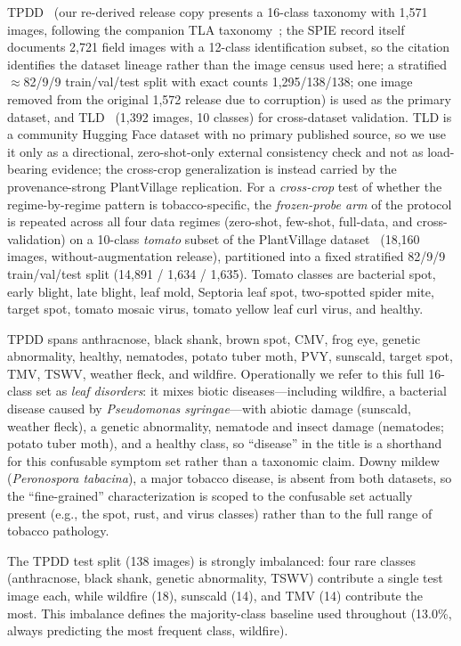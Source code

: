 \documentclass[10pt,a4paper]{article}
\begin{document}
TPDD~\cite{lin2022tpdd} (our re-derived release copy presents a 16-class taxonomy with 1,571 images, following the companion TLA taxonomy~\cite{lin2024tla}; the SPIE record itself documents 2,721 field images with a 12-class identification subset, so the citation identifies the dataset lineage rather than the image census used here; a stratified $\approx$82/9/9 train/val/test split with exact counts 1,295/138/138; one image removed from the original 1,572 release due to corruption) is used as the primary dataset, and TLD~\cite{tld} (1,392 images, 10 classes) for cross-dataset validation. TLD is a community Hugging Face dataset with no primary published source, so we use it only as a directional, zero-shot-only external consistency check and not as load-bearing evidence; the cross-crop generalization is instead carried by the provenance-strong PlantVillage replication. For a \emph{cross-crop} test of whether the regime-by-regime pattern is tobacco-specific, the \emph{frozen-probe arm} of the protocol is repeated across all four data regimes (zero-shot, few-shot, full-data, and cross-validation) on a 10-class \emph{tomato} subset of the PlantVillage dataset~\cite{plantvillage2016,plantvillage_mendeley} (18{,}160 images, without-augmentation release), partitioned into a fixed stratified 82/9/9 train/val/test split (14{,}891 / 1{,}634 / 1{,}635). Tomato classes are bacterial spot, early blight, late blight, leaf mold, Septoria leaf spot, two-spotted spider mite, target spot, tomato mosaic virus, tomato yellow leaf curl virus, and healthy.

TPDD spans anthracnose, black shank, brown spot, CMV, frog eye, genetic abnormality, healthy, nematodes, potato tuber moth, PVY, sunscald, target spot, TMV, TSWV, weather fleck, and wildfire. Operationally we refer to this full 16-class set as \emph{leaf disorders}: it mixes biotic diseases---including wildfire, a bacterial disease caused by \textit{Pseudomonas syringae}---with abiotic damage (sunscald, weather fleck), a genetic abnormality, nematode and insect damage (nematodes; potato tuber moth), and a healthy class, so ``disease'' in the title is a shorthand for this confusable symptom set rather than a taxonomic claim. Downy mildew (\textit{Peronospora tabacina}), a major tobacco disease, is absent from both datasets, so the ``fine-grained'' characterization is scoped to the confusable set actually present (e.g., the spot, rust, and virus classes) rather than to the full range of tobacco pathology.

The TPDD test split (138 images) is strongly imbalanced: four rare classes (anthracnose, black shank, genetic abnormality, TSWV) contribute a single test image each, while wildfire (18), sunscald (14), and TMV (14) contribute the most.
This imbalance defines the majority-class baseline used throughout (13.0\%, always predicting the most frequent class, wildfire).
\end{document}
